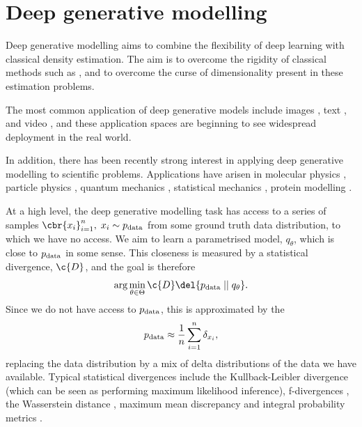 \section{Deep generative modelling}
\label{sec:deep_generative_modelling_background}
Deep generative modelling aims to combine the flexibility of deep learning with classical density estimation.
The aim is to overcome the rigidity of classical methods such as  \cite{rosenblatt1956remarks,parzen1962estimation}, and to overcome the curse of dimensionality present in these estimation problems.

The most common application of deep generative models include images \cite{saharia2022photorealistic,pmlr-v139-ramesh21a}, text \cite{team2023gemini,openai2024gpt4technicalreport}, and video \cite{videoworldsimulators2024}, and these application spaces are beginning to see widespread deployment in the real world.

In addition, there has been recently strong interest in applying deep generative modelling to scientific problems.
Applications have arisen in molecular physics \cite{zheng2023predictingequilibriumdistributionsmolecular,klein2024timewarp}, particle physics \cite{louppe2019adversarial,paganini2018accelerating}, quantum mechanics \cite{cheng2024highlyaccuraterealspaceelectron,PhysRevResearch.2.033429,doi:10.1126/science.adn0137}, statistical mechanics \cite{noe2019boltzmann}, protein modelling \cite{abramson2024accurate,krishna2024generalized}.

At a high level, the deep generative modelling task has access to a series of samples \(\cbr{x_i}_{i=1}^n,\; x_i \sim \pdata\) from some ground truth data distribution, to which we have no access.
We aim to learn a parametrised model, \(q_\theta\), which is close to \(p_{\text{data}}\) in some sense.
This closeness is measured by a statistical divergence, \(\c{D}\), and the goal is therefore
\[\arg \min_{\theta \in \Theta} \c{D}\del{\pdata\from q_\theta }.\]
Since we do not have access to \(p_{\text{data}}\), this is approximated by the 
\[p_{\text{data}} \approx {\frac{1}{n}\sum_{i=1}^n \delta_{x_i}},\]
replacing the data distribution by a mix of delta distributions of the data we have available.
Typical statistical divergences include the Kullback-Leibler divergence \cite{kullback1951information} (which can be seen as performing maximum likelihood inference), f-divergences \cite{renyi1961measures}, the Wasserstein distance \cite{kantorovich1960mathematical}, maximum mean
discrepancy \cite{gretton2012kernel} and integral probability metrics \cite{muller1997integral}.

